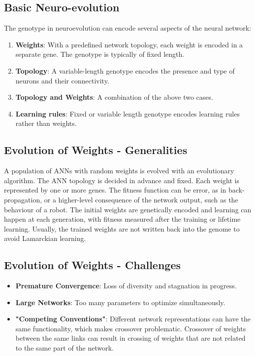 \subsection*{Basic Neuro-evolution}

The genotype in neuroevolution can encode several aspects of the neural network:
\begin{enumerate}
    \item \textbf{Weights}: With a predefined network topology, each weight is encoded in a separate gene. The genotype is typically of fixed length.
    \item \textbf{Topology}: A variable-length genotype encodes the presence and type of neurons and their connectivity.
    \item \textbf{Topology and Weights}: A combination of the above two cases.
   \item  \textbf{Learning rules}: Fixed or variable length genotype encodes learning rules rather than weights.
\end{enumerate}

\subsection*{Evolution of Weights - Generalities}

A population of ANNs with random weights is evolved with an evolutionary algorithm. The ANN topology is decided in advance and fixed. Each weight is represented by one or more genes. The fitness function can be error, as in back-propagation, or a higher-level consequence of the network output, such as the behaviour of a robot. The initial weights are genetically encoded and learning can happen at each generation, with fitness measured after the training or lifetime learning. Usually, the trained weights are not written back into the genome to avoid Lamarckian learning.

\subsection*{Evolution of Weights - Challenges}
\begin{itemize}
    \item \textbf{Premature Convergence}: Loss of diversity and stagnation in progress.
    \item \textbf{Large Networks}:  Too many parameters to optimize simultaneously.
    \item \textbf{"Competing Conventions"}: Different network representations can have the same functionality, which makes crossover problematic. Crossover of weights between the same links can result in crossing of weights that are not related to the same part of the network.
\end{itemize}
